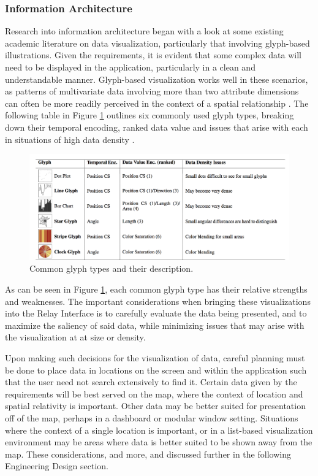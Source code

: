 \documentclass{report}
\begin{document}
\subsubsection{Information Architecture}
Research into information architecture began with a look at some existing academic literature on data visualization, particularly that involving glyph-based illustrations.
Given the requirements, it is evident that some complex data will need to be displayed in the application, particularly in a clean and understandable manner.
Glyph-based visualization works well in these scenarios, as patterns of multivariate data involving more than two attribute dimensions can often be more readily perceived in the context of a spatial relationship \cite{borgo2012glyph}.
The following table in Figure \ref{fig:glyphs} outlines six commonly used glyph types, breaking down their temporal encoding, ranked data value and issues that arise with each in situations of high data density \cite{fuchs2013evaluation}.

\begin{figure}[htbp!]
  \begin{centering}
    \includegraphics[scale=0.27]{figures/glyph_table.png}
    \caption{Common glyph types and their description.}
    \label{fig:glyphs}
  \end{centering}
\end{figure}

As can be seen in Figure \ref{fig:glyphs}, each common glyph type has their relative strengths and weaknesses.
The important considerations when bringing these visualizations into the Relay Interface is to carefully evaluate the data being presented, and to maximize the saliency of said data, while minimizing issues that may arise with the visualization at at size or density.

Upon making such decisions for the visualization of data, careful planning must be done to place data in locations on the screen and within the application such that the user need not search extensively to find it.
Certain data given by the requirements will be best served on the map, where the context of location and spatial relativity is important.
Other data may be better suited for presentation off of the map, perhaps in a dashboard or modular window setting.
Situations where the context of a single location is important, or in a list-based visualization environment may be areas where data is better suited to be shown away from the map.
These considerations, and more, and discussed further in the following Engineering Design section.
\end{document}
